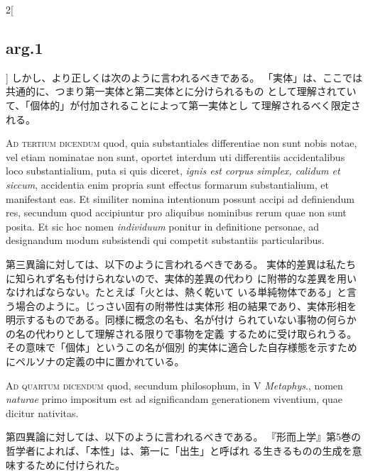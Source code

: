 \documentclass[paper=a4paper,fontsize=10pt,jafontsize=9pt,titlepage]{jlreq}
\begin{document}
\begin{paracol}{2}[\subsection{arg.1}]
しかし、より正しくは次のように言われるべきである。
「実体」は、ここでは共通的に、つまり第一実体と第二実体とに分けられるもの
 として理解されていて、「個体的」が付加されることによって第一実体とし
 て理解されるべく限定される。

\switchcolumn*[\subsection{ad.3}]

{\scshape Ad tertium dicendum} quod, quia substantiales differentiae non sunt nobis
notae, vel etiam nominatae non sunt, oportet interdum uti differentiis
accidentalibus loco substantialium, puta si quis diceret, {\itshape ignis est
corpus simplex, calidum et siccum}, accidentia enim propria sunt effectus
formarum substantialium, et manifestant eas. Et similiter nomina
intentionum possunt accipi ad definiendum res, secundum quod accipiuntur
pro aliquibus nominibus rerum quae non sunt posita. Et sic hoc nomen
{\itshape individuum} ponitur in definitione personae, ad designandum modum
subsistendi qui competit substantiis particularibus.

\switchcolumn

第三異論に対しては、以下のように言われるべきである。
実体的差異は私たちに知られず名も付けられないので、実体的差異の代わり
 に附帯的な差異を用いなければならない。たとえば「火とは、熱く乾いて
 いる単純物体である」と言う場合のように。じっさい固有の附帯性は実体形
 相の結果であり、実体形相を明示するものである。同様に概念の名も、名が付け
 られていない事物の何らかの名の代わりとして理解される限りで事物を定義
 するために受け取られうる。その意味で「個体」というこの名が個別
 的実体に適合した自存様態を示すためにペルソナの定義の中に置かれている。

\switchcolumn*[\subsection{ad.4}]

{\scshape Ad quartum dicendum} quod, secundum philosophum, in V {\itshape Metaphys}., nomen
{\itshape naturae} primo impositum est ad significandam generationem viventium,
quae dicitur nativitas.

\switchcolumn

第四異論に対しては、以下のように言われるべきである。
『形而上学』第5巻の哲学者によれば、「本性」は、第一に「出生」と呼ばれ
 る生きるものの生成を意味するために付けられた。

\switchcolumn*


\end{paracol}
\end{document}
